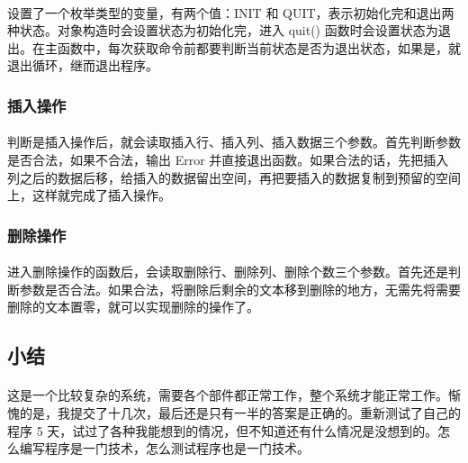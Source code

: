 \documentclass[UTF-8, 12pt]{ctexart}
\begin{document}
        \paragraph{}
        设置了一个枚举类型的变量，有两个值：INIT 和 QUIT，表示初始化完和退出两种状态。对象构造时会设置状态为初始化完，进入 quit() 函数时会设置状态为退出。在主函数中，每次获取命令前都要判断当前状态是否为退出状态，如果是，就退出循环，继而退出程序。
        \subsubsection{插入操作}
        \paragraph{}
        判断是插入操作后，就会读取插入行、插入列、插入数据三个参数。首先判断参数是否合法，如果不合法，输出 Error 并直接退出函数。如果合法的话，先把插入列之后的数据后移，给插入的数据留出空间，再把要插入的数据复制到预留的空间上，这样就完成了插入操作。
        \subsubsection{删除操作}
        \paragraph{}
        进入删除操作的函数后，会读取删除行、删除列、删除个数三个参数。首先还是判断参数是否合法。如果合法，将删除后剩余的文本移到删除的地方，无需先将需要删除的文本置零，就可以实现删除的操作了。
    \subsection{小结}
    \paragraph{}
    这是一个比较复杂的系统，需要各个部件都正常工作，整个系统才能正常工作。惭愧的是，我提交了十几次，最后还是只有一半的答案是正确的。重新测试了自己的程序 5 天，试过了各种我能想到的情况，但不知道还有什么情况是没想到的。怎么编写程序是一门技术，怎么测试程序也是一门技术。
\end{document}
